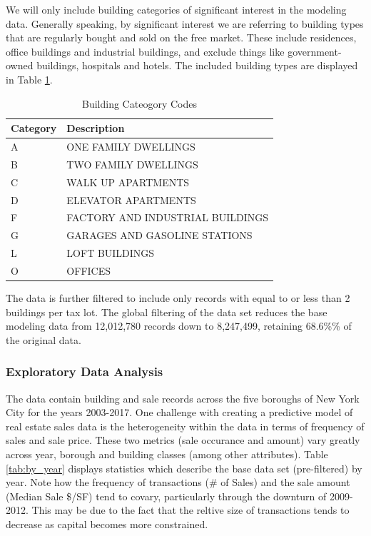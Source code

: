 \documentclass[12pt,]{article}
\begin{document}
We will only include building categories of significant interest in the
modeling data. Generally speaking, by significant interest we are
referring to building types that are regularly bought and sold on the
free market. These include residences, office buildings and industrial
buildings, and exclude things like government-owned buildings, hospitals
and hotels. The included building types are displayed in Table
\ref{tab:categoryTable}.

\begin{table}

\caption{\label{tab:unnamed-chunk-6}\label{tab:categoryTable} Building Cateogory Codes}
\centering
\begin{tabular}[t]{ll}
\toprule
Category & Description\\
\midrule
A & ONE FAMILY DWELLINGS\\
B & TWO FAMILY DWELLINGS\\
C & WALK UP APARTMENTS\\
D & ELEVATOR APARTMENTS\\
F & FACTORY AND INDUSTRIAL BUILDINGS\\
\addlinespace
G & GARAGES AND GASOLINE STATIONS\\
L & LOFT BUILDINGS\\
O & OFFICES\\
\bottomrule
\end{tabular}
\end{table}

The data is further filtered to include only records with equal to or
less than 2 buildings per tax lot. The global filtering of the data set
reduces the base modeling data from 12,012,780 records down to
8,247,499, retaining 68.6\%\% of the original data.

\hypertarget{exploratory-data-analysis}{%
\subsubsection{Exploratory Data
Analysis}\label{exploratory-data-analysis}}

The data contain building and sale records across the five boroughs of
New York City for the years 2003-2017. One challenge with creating a
predictive model of real estate sales data is the heterogeneity within
the data in terms of frequency of sales and sale price. These two
metrics (sale occurance and amount) vary greatly across year, borough
and building classes (among other attributes). Table \ref{tab:by_year}
displays statistics which describe the base data set (pre-filtered) by
year. Note how the frequency of transactions (\# of Sales) and the sale
amount (Median Sale \$/SF) tend to covary, particularly through the
downturn of 2009-2012. This may be due to the fact that the reltive size
of transactions tends to decrease as capital becomes more constrained.
\end{document}
